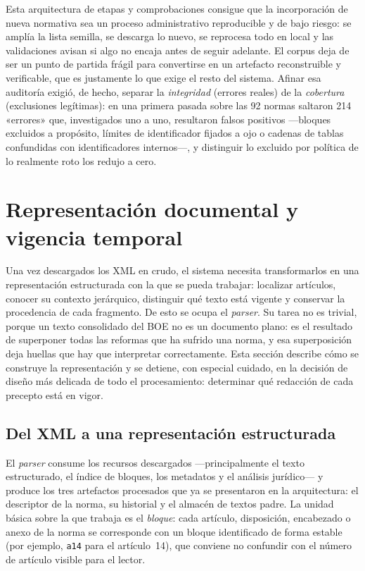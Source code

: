 Esta arquitectura de etapas y comprobaciones consigue que la incorporación de nueva normativa sea un proceso administrativo reproducible y de bajo riesgo: se amplía la lista semilla, se descarga lo nuevo, se reprocesa todo en local y las validaciones avisan si algo no encaja antes de seguir adelante. El corpus deja de ser un punto de partida frágil para convertirse en un artefacto reconstruible y verificable, que es justamente lo que exige el resto del sistema. Afinar esa auditoría exigió, de hecho, separar la \emph{integridad} (errores reales) de la \emph{cobertura} (exclusiones legítimas): en una primera pasada sobre las 92 normas saltaron 214 «errores» que, investigados uno a uno, resultaron falsos positivos —bloques excluidos a propósito, límites de identificador fijados a ojo o cadenas de tablas confundidas con identificadores internos—, y distinguir lo excluido por política de lo realmente roto los redujo a cero.

\section{Representación documental y vigencia temporal}
\label{sec:representacion}

Una vez descargados los XML en crudo, el sistema necesita transformarlos en una representación estructurada con la que se pueda trabajar: localizar artículos, conocer su contexto jerárquico, distinguir qué texto está vigente y conservar la procedencia de cada fragmento. De esto se ocupa el \emph{parser}. Su tarea no es trivial, porque un texto consolidado del BOE no es un documento plano: es el resultado de superponer todas las reformas que ha sufrido una norma, y esa superposición deja huellas que hay que interpretar correctamente. Esta sección describe cómo se construye la representación y se detiene, con especial cuidado, en la decisión de diseño más delicada de todo el procesamiento: determinar qué redacción de cada precepto está en vigor.

\subsection{Del XML a una representación estructurada}
\label{subsec:parser}

El \emph{parser} consume los recursos descargados —principalmente el texto estructurado, el índice de bloques, los metadatos y el análisis jurídico— y produce los tres artefactos procesados que ya se presentaron en la arquitectura: el descriptor de la norma, su historial y el almacén de textos padre. La unidad básica sobre la que trabaja es el \emph{bloque}: cada artículo, disposición, encabezado o anexo de la norma se corresponde con un bloque identificado de forma estable (por ejemplo, \texttt{a14} para el artículo~14), que conviene no confundir con el número de artículo visible para el lector.

